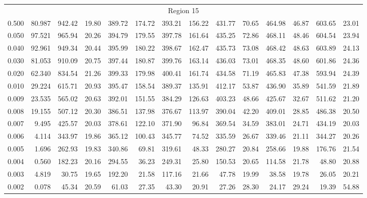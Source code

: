 \begin{tabular}{@{}lrrrrrrrrrrrrr@{}}
\midrule
\multicolumn{14}{c}{Region 15} \\
\cmidrule{1-14}
0.500 & 80.987 & 942.42 & 19.80 & 389.72 & 174.72 & 393.21 & 156.22 & 431.77 & 70.65 & 464.98 & 46.87 & 603.65 & 23.01 \\
0.050 & 97.521 & 965.94 & 20.26 & 394.79 & 179.55 & 397.78 & 161.64 & 435.25 & 72.86 & 468.11 & 48.46 & 604.54 & 23.94 \\
0.040 & 92.961 & 949.34 & 20.44 & 395.99 & 180.22 & 398.67 & 162.47 & 435.73 & 73.08 & 468.42 & 48.63 & 603.89 & 24.13 \\
0.030 & 81.053 & 910.09 & 20.75 & 397.44 & 180.87 & 399.76 & 163.14 & 436.03 & 73.01 & 468.35 & 48.60 & 601.86 & 24.36 \\
0.020 & 62.340 & 834.54 & 21.26 & 399.33 & 179.98 & 400.41 & 161.74 & 434.58 & 71.19 & 465.83 & 47.38 & 593.94 & 24.39 \\
0.010 & 29.224 & 615.71 & 20.93 & 395.47 & 158.54 & 389.37 & 135.91 & 412.17 & 53.87 & 436.90 & 35.89 & 541.59 & 21.89 \\
0.009 & 23.535 & 565.02 & 20.63 & 392.01 & 151.55 & 384.29 & 126.63 & 403.23 & 48.66 & 425.67 & 32.67 & 511.62 & 21.20 \\
0.008 & 19.155 & 507.12 & 20.30 & 386.51 & 137.98 & 376.67 & 113.97 & 390.04 & 42.20 & 409.01 & 28.85 & 486.38 & 20.50 \\
0.007 & 9.495 & 425.57 & 20.03 & 378.61 & 122.10 & 371.90 & 96.84 & 369.54 & 34.59 & 383.01 & 24.71 & 434.19 & 20.03 \\
0.006 & 4.114 & 343.97 & 19.86 & 365.12 & 100.43 & 345.77 & 74.52 & 335.59 & 26.67 & 339.46 & 21.11 & 344.27 & 20.26 \\
0.005 & 1.696 & 262.93 & 19.83 & 340.86 & 69.81 & 319.61 & 48.33 & 280.27 & 20.84 & 258.66 & 19.88 & 176.76 & 21.54 \\
0.004 & 0.560 & 182.23 & 20.16 & 294.55 & 36.23 & 249.31 & 25.80 & 150.53 & 20.65 & 114.58 & 21.78 & 48.80 & 20.88 \\
0.003 & 4.819 & 30.75 & 19.65 & 192.20 & 21.58 & 117.16 & 21.66 & 47.78 & 19.99 & 38.58 & 19.78 & 26.05 & 20.21 \\
0.002 & 0.078 & 45.34 & 20.59 & 61.03 & 27.35 & 43.30 & 20.91 & 27.26 & 28.30 & 24.17 & 29.24 & 19.39 & 54.88 \\


\end{tabular}
